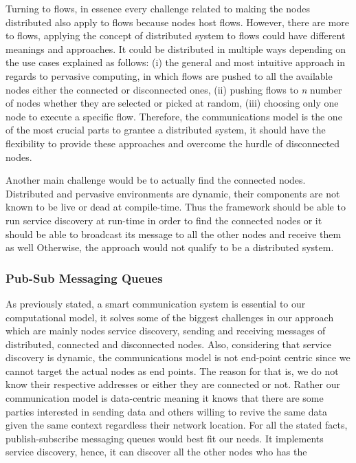 
Turning to flows, in essence every challenge related to making the nodes distributed also apply to flows because nodes host flows. However, there are more to flows, applying the concept of distributed system to flows could have different meanings and approaches. It could be distributed in multiple ways depending on the use cases explained as follows: (i) the general and most intuitive approach in regards to pervasive computing, in which flows are pushed to all the available nodes either the connected or disconnected ones, (ii) pushing flows to \textit{n} number of nodes whether they are selected or picked at random, (iii) choosing only one node to execute a specific flow. Therefore, the communications model is the one of the most crucial parts to grantee a distributed system, it should have the flexibility to provide these approaches and overcome the hurdle of disconnected nodes.

Another main challenge would be to actually find the connected nodes. Distributed and pervasive environments are dynamic, their components are not known to be live or dead at compile-time. Thus the framework should be able to run service discovery at run-time in order to find the connected nodes or it should be able to broadcast its message to all the other nodes and receive them as well Otherwise, the approach would not qualify to be a distributed system.


\newpage

\subsubsection{Pub-Sub Messaging Queues}

As previously stated, a smart communication system is essential to our computational model, it solves some of the biggest challenges in our approach which are mainly nodes service discovery, sending and receiving messages of distributed, connected and disconnected nodes. Also, considering that service discovery is dynamic, the communications model is not end-point centric since we cannot target the actual nodes as end points. The reason for that is, we do not know their respective addresses or either they are connected or not. Rather our communication model is data-centric meaning it knows that there are some parties interested in sending data and others willing to revive the same data given the same context regardless their network location.
For all the stated facts, publish-subscribe messaging queues would best fit our needs. It implements service discovery, hence, it can discover all the other nodes who has the 



